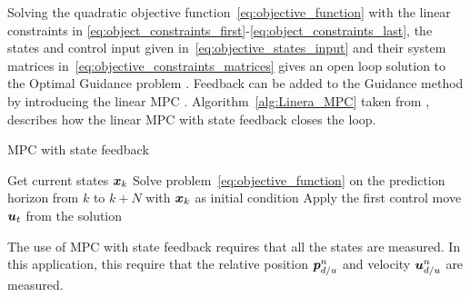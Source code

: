 Solving the quadratic objective function~\ref{eq:objective_function} with the linear constraints in \ref{eq:object_constraints_first}-\ref{eq:object_constraints_last}, the states and control input given in~\ref{eq:objective_states_input} and their system matrices in~\ref{eq:objective_constraints_matrices} gives an open loop solution to the Optimal Guidance problem \citep{foss2013merging}. Feedback can be added to the Guidance method by introducing the linear \gls{MPC} \citep{foss2013merging}. Algorithm~\ref{alg:Linera_MPC} taken from \cite{foss2013merging}, describes how the linear \gls{MPC} with state feedback closes the loop. 
\begin{algorithm}
\caption{MPC with state feedback}\label{alg:Linera_MPC}
	\begin{algorithmic}[1]
			\State Get current states $\boldsymbol{x}_k$
			\State Solve problem~\ref{eq:objective_function} on the prediction horizon from $k$ to $k+N$ with $\boldsymbol{x}_k$ as initial condition
			\State Apply the first control move $\boldsymbol{u}_t$ from the solution
		\EndFor
	\end{algorithmic}
\end{algorithm}
The use of \gls{MPC} with state feedback requires that all the states are measured. In this application, this require that the relative position $\boldsymbol{p}^n_{d/u}$ and velocity $\boldsymbol{u}^n_{d/u}$ are measured.



